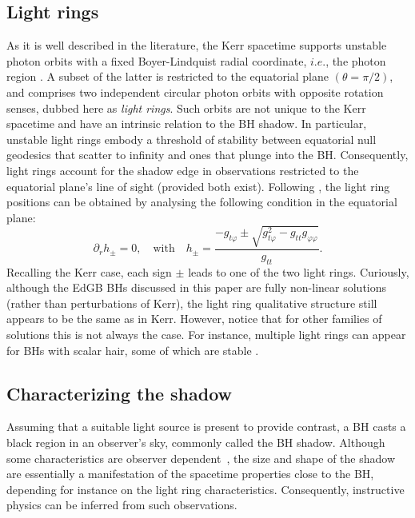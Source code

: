 \documentclass[12pt]{article}
\begin{document}
\subsection{Light rings}
\label{subsection_Ligh-rings}

As it is well described in the literature, the Kerr spacetime supports unstable photon orbits with a fixed {Boyer-Lindquist} radial coordinate, $i.e.$, the photon region
\cite{Bardeen:1973tla}. A subset of the latter is restricted to the equatorial plane $(\theta=\pi/2)$, and comprises two independent circular photon orbits with opposite rotation senses, dubbed here as \textit{light rings}.  Such orbits are not unique to the Kerr spacetime and have an intrinsic relation to the BH shadow. In particular, unstable light rings embody a threshold of stability between equatorial null geodesics that scatter to infinity and ones that plunge into the BH. Consequently, light rings account for the shadow edge in observations restricted to the equatorial plane's line of sight (provided both exist).   
Following \cite{Cunha:2016bjh}, the light ring positions can be obtained by analysing the following condition in the equatorial plane:
\begin{equation}\partial_rh_\pm=0,\quad \textrm{with}\quad h_\pm=\frac{-g_{t\varphi}\pm\sqrt{g^2_{t\varphi}-g_{tt}g_{\varphi\varphi}}}{g_{tt}}.\end{equation}
Recalling the Kerr case, each sign $\pm$ leads to one of the two light rings. Curiously, although the EdGB BHs discussed in this paper are fully non-linear solutions (rather than perturbations of Kerr), the light ring qualitative structure still appears to be the same as in Kerr. However, notice that for other families of solutions this is not always the case. For instance, multiple light rings can appear for BHs with scalar hair, some of which are stable \cite{Cunha:2016bjh}.\\

\subsection{Characterizing the shadow}

Assuming that a suitable light source is present to provide contrast, a BH casts a black region in an observer's sky, commonly called the BH shadow. Although some characteristics are observer dependent~\cite{Vincent:2016sjq}, the size and shape of the shadow are essentially a manifestation of the spacetime properties close to the BH, depending for instance on the light ring characteristics. Consequently, instructive physics can be inferred from such observations. \\
\end{document}
